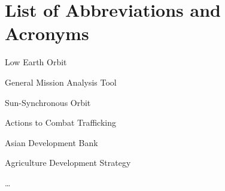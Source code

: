\chapter{List of Abbreviations and Acronyms}

 
\begin{description}[leftmargin=*, widest=DCCHTM]
    
    \item[LEO]
    Low Earth Orbit

    \item[GMAT]
    General Mission Analysis Tool

    \item[SSO]
    Sun-Synchronous Orbit
    
    \item[ACT]
    Actions to Combat Trafficking
    
    \item[ADB]
    Asian Development Bank
    
    \item[ADS]
    Agriculture Development Strategy
    
    \ldots{}
    
    
\end{description}